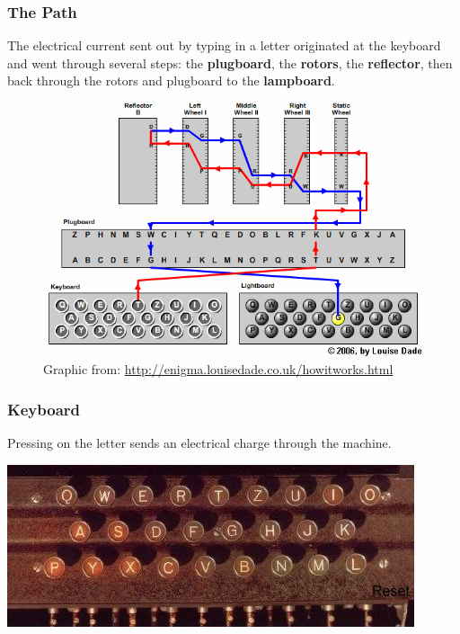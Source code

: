 \documentclass{beamer}
\newcommand{\<}{\langle}
\renewcommand{\>}{\rangle}
\begin{document}
\begin{frame}
\frametitle{The Path}

\small
The electrical current sent out by typing in a letter originated at the keyboard and went through several steps: the \textbf{plugboard}, the \textbf{rotors}, the \textbf{reflector}, then back through the rotors and plugboard to the \textbf{lampboard}.

\begin{figure}
\includegraphics[scale=.45]{IMG/wiring}
\caption{\scriptsize Graphic from: \url{http://enigma.louisedade.co.uk/howitworks.html}}
\end{figure}
\end{frame}

\begin{frame}
\frametitle{Keyboard}

Pressing on the letter sends an electrical charge through the machine. 
\begin{center}
\includegraphics[scale=.5]{IMG/keyboard}
\end{center}
\end{frame}
\end{document}
